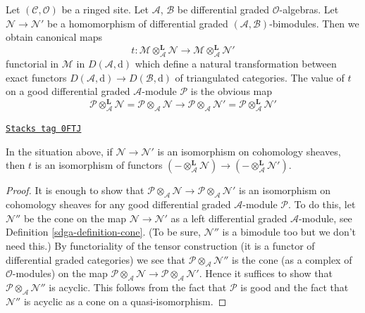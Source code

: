 Let $(\mathcal{C}, \mathcal{O})$ be a ringed site. Let
$\mathcal{A}$, $\mathcal{B}$ be differential graded $\mathcal{O}$-algebras.
Let $\mathcal{N} \to \mathcal{N}'$ be a homomorphism of differential graded
$(\mathcal{A}, \mathcal{B})$-bimodules. Then we obtain canonical
maps
$$
t :
\mathcal{M} \otimes_\mathcal{A}^\mathbf{L} \mathcal{N}
\longrightarrow
\mathcal{M} \otimes_\mathcal{A}^\mathbf{L} \mathcal{N}'
$$
functorial in $\mathcal{M}$ in $D(\mathcal{A}, \text{d})$
which define a natural transformation between exact functors
$D(\mathcal{A}, \text{d}) \to D(\mathcal{B}, \text{d})$
of triangulated categories. The value of $t$ on a good differential
graded $\mathcal{A}$-module $\mathcal{P}$ is the obvious map
$$
\mathcal{P} \otimes_\mathcal{A}^\mathbf{L} \mathcal{N} =
\mathcal{P} \otimes_\mathcal{A} \mathcal{N}
\longrightarrow
\mathcal{P} \otimes_\mathcal{A} \mathcal{N}' =
\mathcal{P} \otimes_\mathcal{A}^\mathbf{L} \mathcal{N}'
$$

\begin{lemma}
\label{sdga-lemma-tensor-symmetry}
\href{https://stacks.math.columbia.edu/tag/0FTJ}{\texttt{Stacks tag 0FTJ}}

In the situation above, if $\mathcal{N} \to \mathcal{N}'$ is an isomorphism
on cohomology sheaves, then $t$ is an isomorphism of functors
$(- \otimes_\mathcal{A}^\mathbf{L} \mathcal{N}) \to
(- \otimes_\mathcal{A}^\mathbf{L} \mathcal{N}')$.
\end{lemma}

\begin{proof}

It is enough to show that
$\mathcal{P} \otimes_\mathcal{A} \mathcal{N} \to
\mathcal{P} \otimes_\mathcal{A} \mathcal{N}'$
is an isomorphism on cohomology sheaves for any good differential
graded $\mathcal{A}$-module $\mathcal{P}$.
To do this, let $\mathcal{N}''$ be the cone on the map
$\mathcal{N} \to \mathcal{N}'$ as a left differential graded
$\mathcal{A}$-module, see Definition \ref{sdga-definition-cone}.
(To be sure, $\mathcal{N}''$ is a bimodule too but we
don't need this.) By functoriality of the tensor construction
(it is a functor of differential graded categories)
we see that $\mathcal{P} \otimes_\mathcal{A} \mathcal{N}''$
is the cone (as a complex of $\mathcal{O}$-modules) on the map
$\mathcal{P} \otimes_\mathcal{A} \mathcal{N} \to
\mathcal{P} \otimes_\mathcal{A} \mathcal{N}'$.
Hence it suffices to show that
$\mathcal{P} \otimes_\mathcal{A} \mathcal{N}''$
is acyclic. This follows from the fact that $\mathcal{P}$
is good and the fact that $\mathcal{N}''$ is acyclic
as a cone on a quasi-isomorphism.
\end{proof}

